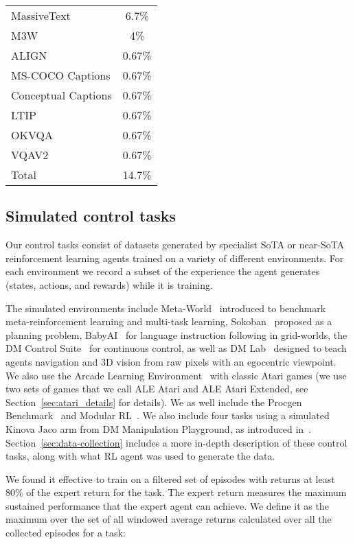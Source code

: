 \documentclass[10pt]{article} \usepackage[accepted]{tmlr}
\newcommand{\dmlab}{{DM Lab}}
\newcommand{\atari}{{ALE Atari}}
\newcommand{\ataritwo}{{ALE Atari Extended}}
\newcommand{\sokoban}{{Sokoban}}
\newcommand{\babyai}{{BabyAI}}
\newcommand{\dmcontrol}{{DM Control Suite}}
\newcommand{\metaworld}{{Meta-World}}
\newcommand{\procgen}{{Procgen Benchmark}}
\newcommand{\mrl}{{Modular RL}}
\newcommand{\mpg}{{DM Manipulation Playground}}
\begin{document}
\begin{table*}
{\begin{tabular}[t]{|l|c|}
        \hline
        MassiveText & 6.7\%  \\
        M3W & 4\% \\  
        ALIGN & 0.67\% \\
        MS-COCO Captions  & 0.67\% \\
        Conceptual Captions & 0.67\% \\
        LTIP& 0.67\% \\
        OKVQA & 0.67\% \\
        VQAV2 & 0.67\% \\
        \hline
        Total & 14.7\% \\
        \hline
    \end{tabular}
    }
\end{table*}
\vskip 0.4cm
\subsection{Simulated control tasks}
\vskip 0.2cm
Our control tasks consist of datasets generated by specialist SoTA or near-SoTA reinforcement learning agents trained on a variety of different environments.
For each environment we record a subset of the experience the agent generates (states, actions, and rewards) while it is training. 

The simulated environments include
\metaworld{}~\citep{yu2020meta} introduced to benchmark meta-reinforcement learning and multi-task learning, 
\sokoban{}~\citep{racaniere2017imagination} proposed as a planning problem,
\babyai{}~\citep{chevalier2018babyai} for language instruction following in grid-worlds,
the \dmcontrol{}~\citep{tunyasuvunakool2020dmcontrol} for continuous control, as well as
\dmlab{}~\citep{beattie2016deepmind} designed to teach agents navigation and 3D vision from raw pixels with an egocentric viewpoint.
We also use the Arcade Learning Environment~\citep{bellemare2013arcade} with classic Atari games (we use two sets of games that we call \atari{} and \ataritwo{}, see Section~\ref{sec:atari_details} for details).
We as well include the \procgen{}~\citep{cobbe2020leveraging} and  \mrl{}~\citep{huang2020one}.
We also include four tasks using a simulated Kinova Jaco arm from \mpg{}, as introduced in~\cite{zolna2020offline}.
Section~\ref{sec:data-collection} includes a more in-depth description of these control tasks, along with what RL agent was used to generate the data.

We found it effective to train on a filtered set of episodes with returns at least 80\% of the expert return for the task.
The expert return measures the maximum sustained performance that the expert agent can achieve.
We define it as the maximum over the set of all windowed average returns calculated over all the collected episodes for a task:
\end{document}
